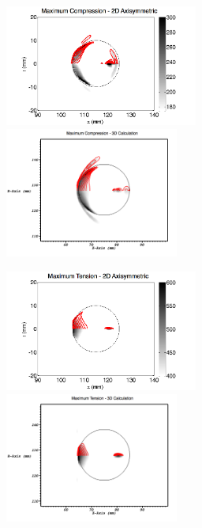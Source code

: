 \documentclass{article}
\begin{document}
\begin{figure}[h!]
\begin{center}
\includegraphics[width=2.5in]{sphere_comp/compress_axisym_contour.png}\hspace{-10mm}
\includegraphics[width=2.25in]{sphere_comp/compress_contour_3d_annotate.png}
\vskip 5pt

\includegraphics[width=2.5in]{sphere_comp/tension_axisym_contour.png}\hspace{-10mm}
\includegraphics[width=2.25in]{sphere_comp/tension_contour_3d_annotate.png}


\end{center}
\end{figure}
\end{document}
